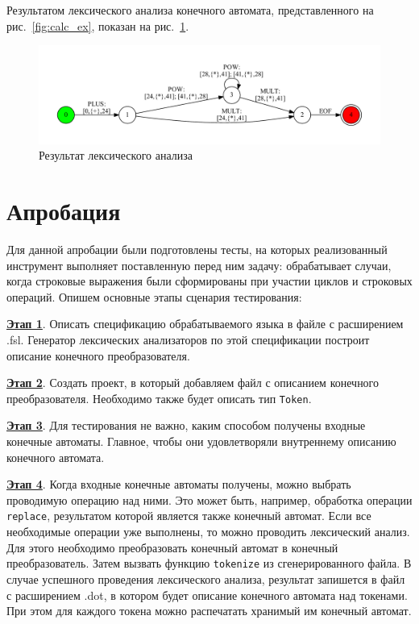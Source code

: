 Результатом лексического анализа конечного автомата, представленного на рис.~\ref{fig:calc_ex}, показан на рис.~\ref{fig:calc_ex_res}. 

\begin{figure}[h!]
\begin{center}
\includegraphics[width=1.0\textwidth]{Polubelova/calc_ex_res}
\caption{Результат лексического анализа}
\label{fig:calc_ex_res} 
\end{center}
\end{figure}


\section{Апробация}

Для данной апробации были подготовлены тесты, на которых реализованный инструмент выполняет поставленную перед ним задачу: обрабатывает случаи, когда строковые выражения были сформированы при участии циклов и строковых операций. Опишем основные этапы сценария тестирования:

\textbf{\underline{Этап 1}}. Описать спецификацию обрабатываемого языка в файле с расширением .fsl. Генератор лексических анализаторов по этой спецификации построит описание конечного преобразователя. 

\textbf{\underline{Этап 2}}. Создать проект, в который добавляем файл с описанием конечного преобразователя. Необходимо также будет описать тип \verb|Token|. 

\textbf{\underline{Этап 3}}. Для тестирования не важно, каким способом получены входные конечные автоматы. Главное, чтобы они удовлетворяли внутреннему описанию конечного автомата. 

\textbf{\underline{Этап 4}}. Когда входные конечные автоматы получены, можно выбрать проводимую операцию над ними. Это может быть, например, обработка операции \verb|replace|, результатом которой является также конечный автомат. Если все необходимые операции уже выполнены, то можно проводить лексический анализ. Для этого необходимо преобразовать конечный автомат в конечный преобразователь. Затем вызвать функцию \verb|tokenize| из сгенерированного файла. В случае успешного проведения лексического анализа, результат запишется в файл с расширением .dot, в котором будет описание конечного автомата над токенами. При этом для каждого токена можно распечатать хранимый им конечный автомат.


